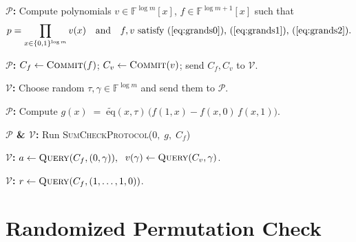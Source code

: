\documentclass{zkdl-presentation-template}
\begin{document}
    \begin{frame}
        \begin{algorithm}[H]
            \caption{Sum-Check-based Protocol for Grand Products}\label{alg:sum_check_grand_product}
            \DontPrintSemicolon
            \SetAlgoLined

            \textbf{$\mathcal P$:}
            Compute polynomials 
            $v\in\mathbb{F}^{\log m}[x]$, 
            $f\in\mathbb{F}^{\log m+1}[x]$ 
            such that
            \vspace{-1em}
            \begin{equation*}
                \vspace{-1.6em}
                p = \prod_{x\in\{0,1\}^{\log m}} v(x)
                \quad\text{and}\quad
                f, v \text{ satisfy }(\ref{eq:grands0}),\,(\ref{eq:grands1}),\,(\ref{eq:grands2}).
                \vspace{-5px}
            \end{equation*}\;

            \textbf{$\mathcal P$:}
            $C_f \leftarrow \textsc{Commit}(f)$;
            $C_v \leftarrow \textsc{Commit}(v)$;
            send $C_f, C_v$ to $\mathcal V$.\;

            \textbf{$\mathcal V$:}
            Choose random $\tau,\gamma\in\mathbb{F}^{\log m}$ and send them to $\mathcal P$.\;

            \textbf{$\mathcal P$:}
            Compute $g(x)\;=\;\widetilde{\mathrm{eq}}(x,\tau)\,\bigl(f(1,x)-f(x,0)\,f(x,1)\bigr).$

            \textbf{$\mathcal P$ \& $\mathcal V$:}
            Run \textsc{SumCheckProtocol}($0,\;g,\;C_f$)

            \textbf{$\mathcal V$:}
            $a \leftarrow \textsc{Query}(C_f,(0,\gamma)), \;$ $v(\gamma)\leftarrow \textsc{Query}(C_v,\gamma)$.\;

            \textbf{$\mathcal V$:}
            $r \leftarrow \textsc{Query}(C_f,(1,\dots,1,0))$.\;
        \end{algorithm}
    \end{frame}

    \section{Randomized Permutation Check}
\end{document}
